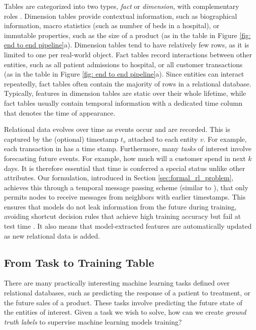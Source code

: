  Tables are categorized into two types, \emph{fact} or \emph{dimension},  with complementary roles \citep{ullman-book}. Dimension tables provide contextual information, such as biographical information, macro statistics (such as number of beds in a hospital), or immutable properties, such as the size of a product (as in the  table in Figure \ref{fig: end to end pipeline}a). Dimension tables tend to have relatively few rows, as it is limited to one per real-world object. Fact tables record interactions between other entities, such as all patient admissions to hospital, or all customer transactions (as in the  table in Figure \ref{fig: end to end pipeline}a). Since entities can interact repeatedly, fact tables often contain the majority of rows in a relational database. Typically, features in dimension tables are static over their whole lifetime, while fact tables usually contain temporal information with a dedicated time column that denotes the time of appearance.


Relational data evolves over time as events occur and are recorded. 
%
This is captured by the (optional) timestamp $t_v$ attached to each entity $v$. For example, each transaction in  has a time stamp.
Furthermore, many \emph{tasks} of interest involve forecasting future events. For example, how much will a customer spend in next $k$ days. It is therefore essential that time is conferred a special status unlike other attributes.  Our formulation, introduced in Section \ref{sec:formal_rl_problem}, achieves this through a temporal message passing scheme (similar to \cite{rossi2020temporal}), that only permits nodes to receive messages from neighbors with earlier timestamps. This ensures that models do not leak information from the future during training, avoiding shortcut decision rules that achieve high training accuracy but fail at test time \citep{geirhos2020shortcut}. It also means that model-extracted features are automatically updated as new relational data is added.

\subsection{From Task to Training Table}
\label{sec:predictive_labels}

There are many practically interesting machine learning tasks defined over relational databases, such as predicting the response of a patient to treatment, or the future sales of a product.
These tasks involve predicting the future state of the entities of interest.
Given a task we wish to solve, how can we create \emph{ground truth labels} to supervise machine learning models training? 

